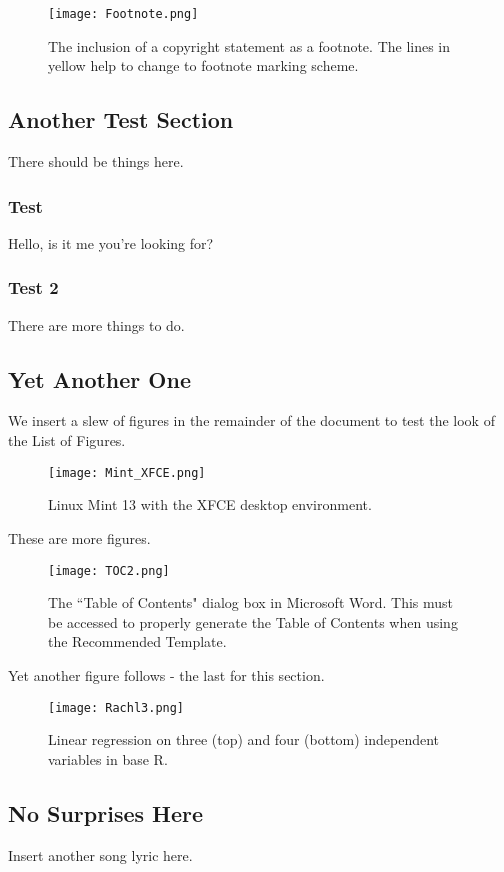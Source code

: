 \begin{figure}[ht!]
\centering
	\texttt{[image: Footnote.png]}
	\caption{The inclusion of a copyright statement as a footnote. The lines in yellow help to change to footnote marking scheme.}
\end{figure}

\subsection{Another Test Section}
There should be things here.


\subsubsection{Test}
Hello, is it me you're looking for?

\subsubsection{Test 2}
There are more things to do.

\subsection{Yet Another One}
 We insert a slew of figures in the remainder of the document to test the look of the List of Figures.

\begin{figure}[H]
	\centering
	\texttt{[image: Mint\_XFCE.png]}
	\caption{Linux Mint 13 with the XFCE desktop environment.}
\end{figure}

These are more figures.

\begin{figure}[H]
	\centering
	\texttt{[image: TOC2.png]}
	\singlespace
	\caption{The ``Table of Contents" dialog box in Microsoft Word. This must be accessed to properly generate the Table of Contents when using the Recommended Template.}
\end{figure}

Yet another figure follows - the last for this section.

\begin{figure}[H]
	\centering
	\texttt{[image: Rachl3.png]}
	\singlespace
	\caption{Linear regression on three (top) and four (bottom) independent variables in base R.}
\end{figure}
 
 \subsection{No Surprises Here}
 Insert another song lyric here.


